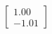 \documentclass[preview]{standalone}
\begin{document}
\begin{align*}
\begin{bmatrix} 1.00 \\ -1.01 \end{bmatrix}
\end{align*}
\end{document}

